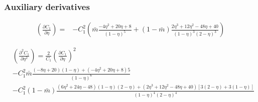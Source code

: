 \documentclass[english]{../thermomemo/thermomemo}
\newcommand*{\pder}[2]{\left(\frac{\partial #1}{\partial #2}\right)}
\newcommand*{\pdder}[2]{\left(\frac{\partial^2 #1}{\partial #2^2}\right)}
\newcommand*{\pdcross}[3]{\left(\frac{\partial^2 #1}{\partial #2 \partial #3}\right)}
\newcommand{\lp}{\left(}
\newcommand{\rp}{\right)}
\begin{document}







\subsubsection*{Auxiliary derivatives}
\begin{align}
  \pder{C_1}{\eta} = & -C_1^2 \lp \bar m \frac{-4 \eta^2 + 20 \eta + 8}{(1 - \eta)^5} +  (1-\bar m) \frac{2 \eta^3+12 \eta^2-48 \eta+40}{(1-\eta)^3 (2-\eta)^3} \rp
\end{align}

\begin{equation}
  \begin{aligned}
    &\pdder{C_1}{\eta} = \frac{2}{C_1} \pder{C_1}{\eta}^2 \\
    &- C_1^2 \bar m \frac{(-8 \eta + 20)(1-\eta) + (-4 \eta^2 + 20 \eta + 8) 5 }{(1 - \eta)^6} \\
    &- C_1^2 (1-\bar m) \frac{(6 \eta^2+24 \eta - 48)(1-\eta) (2-\eta) + (2 \eta^3+12 \eta^2-48 \eta+40)[3(2-\eta) + 3(1-\eta)] }{(1-\eta)^4 (2-\eta)^4}
  \end{aligned}
\end{equation}
\end{document}
